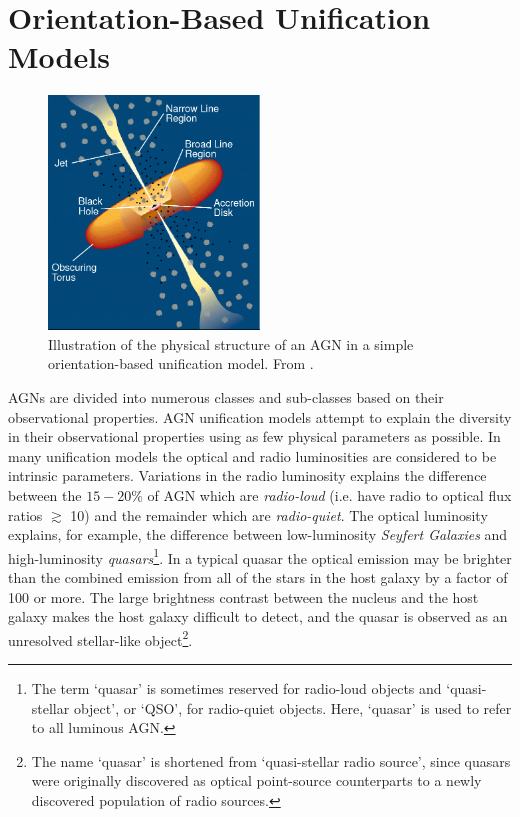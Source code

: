 \section{Orientation-Based Unification Models}

\begin{figure}
  \centering
  \includegraphics[width=0.5\textwidth]{figures/chapter05/urry_model}
  \caption{Illustration of the physical structure of an AGN in a simple orientation-based unification model. From \citet{urry95}.}
  \label{fig:agnmodel}
\end{figure}

AGNs are divided into numerous classes and sub-classes based on their observational properties. 
AGN unification models \citep{antonucci93,urry95} attempt to explain the diversity in their observational properties using as few physical parameters as possible. 
In many unification models the optical and radio luminosities are considered to be intrinsic parameters. Variations in the radio luminosity explains the difference between the $15-20\%$ of AGN which are {\it radio-loud} (i.e. have radio to optical flux ratios $\gtrsim$ 10) and the remainder which are {\it radio-quiet}. 
The optical luminosity explains, for example, the difference between low-luminosity {\it Seyfert Galaxies} and high-luminosity {\it quasars}\footnote{The term `quasar' is sometimes reserved for radio-loud objects and `quasi-stellar object', or `QSO', for radio-quiet objects. Here, `quasar' is used to refer to all luminous AGN.}.
In a typical quasar the optical emission may be brighter than the combined emission from all of the stars in the host galaxy by a factor of 100 or more. 
The large brightness contrast between the nucleus and the host galaxy makes the host galaxy difficult to detect, and the quasar is observed as an unresolved stellar-like object\footnote{The name `quasar' is shortened from `quasi-stellar radio source', since quasars were originally discovered as optical point-source counterparts to a newly discovered population of radio sources.}.   


